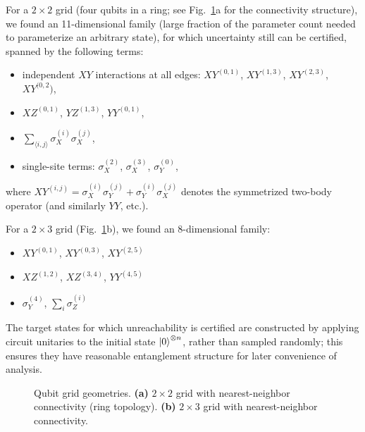 \documentclass[aps,prx,reprint,superscriptaddress,footnote, twocolumn,notitlepage]{revtex4-2}
\begin{document}
For a $2 \times 2$ grid (four qubits in a ring; see Fig.~\ref{fig:grids}a for the connectivity structure), we found an 11-dimensional family (large fraction of the parameter count needed to parameterize an arbitrary state), for which uncertainty still can be certified, spanned by the following terms:
\begin{itemize}
\item independent $XY$ interactions at all edges: $XY^{(0,1)}$, $XY^{(1,3)}$, $XY^{(2,3)}$, $XY^{(0,2})$,
\item $XZ^{(0,1)}$, $YZ^{(1,3)}$, $YY^{(0,1)}$,
\item $\sum_{\langle i,j \rangle} \sigma_X^{(i)} \sigma_X^{(j)}$,
\item single-site terms: $\sigma_X^{(2)}$, $\sigma_X^{(3)}$, $\sigma_Y^{(0)}$,
\end{itemize}
where $XY^{(i,j)} = \sigma_X^{(i)}\sigma_Y^{(j)} + \sigma_Y^{(i)}\sigma_X^{(j)}$ denotes the symmetrized two-body operator (and similarly $YY$, etc.).

For a $2 \times 3$ grid (Fig.~\ref{fig:grids}b), we found an 8-dimensional family:
\begin{itemize}
\item $XY^{(0,1)}$, $XY^{(0,3)}$, $XY^{(2,5)}$
\item $XZ^{(1,2)}$, $XZ^{(3,4)}$, $YY^{(4,5)}$
\item $\sigma_Y^{(4)}$, $\sum_i \sigma_Z^{(i)}$
\end{itemize}

The target states for which unreachability is certified are constructed by applying circuit unitaries to the initial state $\ket{0}^{\otimes n}$, rather than sampled randomly; this ensures they have reasonable entanglement structure for later convenience of analysis.

\begin{figure}[t]
\centering
{}
\caption{Qubit grid geometries. \textbf{(a)} $2 \times 2$ grid with nearest-neighbor connectivity (ring topology). \textbf{(b)} $2 \times 3$ grid with nearest-neighbor connectivity.}
\label{fig:grids}
\end{figure}
\end{document}
